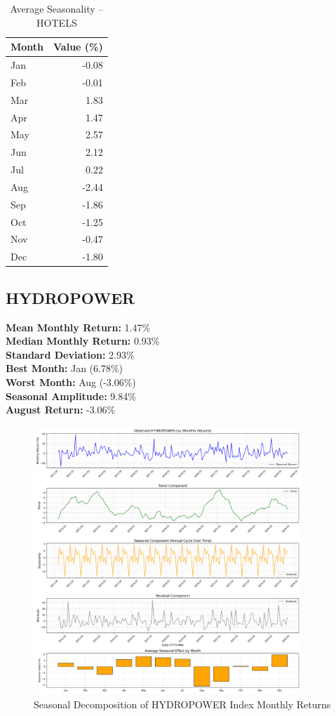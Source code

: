 \documentclass[12pt]{article}
\begin{document}
\begin{table}[h!]
\centering
\caption{Average Seasonality -- HOTELS}
\begin{tabular}{l r}
\toprule
Month & Value (\%) \\
\midrule
Jan & -0.08 \\
Feb & -0.01 \\
Mar & 1.83 \\
Apr & 1.47 \\
May & 2.57 \\
Jun & 2.12 \\
Jul & 0.22 \\
Aug & -2.44 \\
Sep & -1.86 \\
Oct & -1.25 \\
Nov & -0.47 \\
Dec & -1.80 \\
\bottomrule
\end{tabular}
\end{table}


\clearpage

\subsection{HYDROPOWER}
\textbf{Mean Monthly Return:} 1.47\% \\
\textbf{Median Monthly Return:} 0.93\% \\
\textbf{Standard Deviation:} 2.93\% \\
\textbf{Best Month:} Jan (6.78\%) \\
\textbf{Worst Month:} Aug (-3.06\%) \\
\textbf{Seasonal Amplitude:} 9.84\% \\
\textbf{August Return:} -3.06\% \\

\begin{figure}[h!]
    \centering
    \includegraphics[width=0.9\textwidth]{decomposition_outputs/HYDROPOWER_seasonal_decomposition.png}
    \caption{Seasonal Decomposition of HYDROPOWER Index Monthly Returns}
\end{figure}
\end{document}
